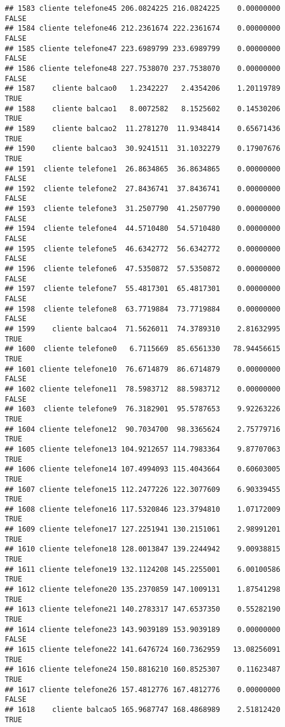 \documentclass[
]{article}
\begin{document}
\begin{verbatim}
## 1583 cliente telefone45 206.0824225 216.0824225    0.00000000    FALSE
## 1584 cliente telefone46 212.2361674 222.2361674    0.00000000    FALSE
## 1585 cliente telefone47 223.6989799 233.6989799    0.00000000    FALSE
## 1586 cliente telefone48 227.7538070 237.7538070    0.00000000    FALSE
## 1587    cliente balcao0   1.2342227   2.4354206    1.20119789     TRUE
## 1588    cliente balcao1   8.0072582   8.1525602    0.14530206     TRUE
## 1589    cliente balcao2  11.2781270  11.9348414    0.65671436     TRUE
## 1590    cliente balcao3  30.9241511  31.1032279    0.17907676     TRUE
## 1591  cliente telefone1  26.8634865  36.8634865    0.00000000    FALSE
## 1592  cliente telefone2  27.8436741  37.8436741    0.00000000    FALSE
## 1593  cliente telefone3  31.2507790  41.2507790    0.00000000    FALSE
## 1594  cliente telefone4  44.5710480  54.5710480    0.00000000    FALSE
## 1595  cliente telefone5  46.6342772  56.6342772    0.00000000    FALSE
## 1596  cliente telefone6  47.5350872  57.5350872    0.00000000    FALSE
## 1597  cliente telefone7  55.4817301  65.4817301    0.00000000    FALSE
## 1598  cliente telefone8  63.7719884  73.7719884    0.00000000    FALSE
## 1599    cliente balcao4  71.5626011  74.3789310    2.81632995     TRUE
## 1600  cliente telefone0   6.7115669  85.6561330   78.94456615     TRUE
## 1601 cliente telefone10  76.6714879  86.6714879    0.00000000    FALSE
## 1602 cliente telefone11  78.5983712  88.5983712    0.00000000    FALSE
## 1603  cliente telefone9  76.3182901  95.5787653    9.92263226     TRUE
## 1604 cliente telefone12  90.7034700  98.3365624    2.75779716     TRUE
## 1605 cliente telefone13 104.9212657 114.7983364    9.87707063     TRUE
## 1606 cliente telefone14 107.4994093 115.4043664    0.60603005     TRUE
## 1607 cliente telefone15 112.2477226 122.3077609    6.90339455     TRUE
## 1608 cliente telefone16 117.5320846 123.3794810    1.07172009     TRUE
## 1609 cliente telefone17 127.2251941 130.2151061    2.98991201     TRUE
## 1610 cliente telefone18 128.0013847 139.2244942    9.00938815     TRUE
## 1611 cliente telefone19 132.1124208 145.2255001    6.00100586     TRUE
## 1612 cliente telefone20 135.2370859 147.1009131    1.87541298     TRUE
## 1613 cliente telefone21 140.2783317 147.6537350    0.55282190     TRUE
## 1614 cliente telefone23 143.9039189 153.9039189    0.00000000    FALSE
## 1615 cliente telefone22 141.6476724 160.7362959   13.08256091     TRUE
## 1616 cliente telefone24 150.8816210 160.8525307    0.11623487     TRUE
## 1617 cliente telefone26 157.4812776 167.4812776    0.00000000    FALSE
## 1618    cliente balcao5 165.9687747 168.4868989    2.51812420     TRUE

\end{verbatim}
\end{document}
